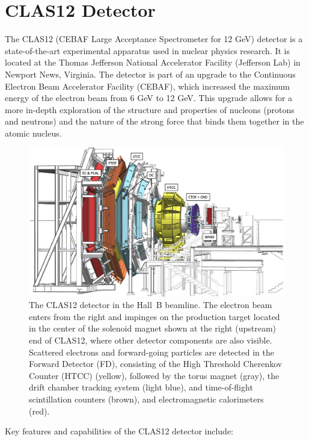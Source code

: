 \documentclass[a4paper,11pt]{article}
\begin{document}
\section{CLAS12 Detector}

The CLAS12 (CEBAF Large Acceptance Spectrometer for 12 GeV) detector is a state-of-the-art experimental apparatus used in nuclear physics research. It is located at the Thomas Jefferson National Accelerator Facility (Jefferson Lab) in Newport News, Virginia. The detector is part of an upgrade to the Continuous Electron Beam Accelerator Facility (CEBAF), which increased the maximum energy of the electron beam from 6 GeV to 12 GeV. This upgrade allows for a more in-depth exploration of the structure and properties of nucleons (protons and neutrons) and the nature of the strong force that binds them together in the atomic nucleus.


\begin{figure}[h!]
\centering
\centerline{\includegraphics[width=0.7\columnwidth]{images/CLAS12-side.png}}
\caption{The CLAS12 detector in the Hall~B beamline. The electron beam enters from the right and impinges on
  the production target located in the center of the solenoid magnet shown at the right (upstream) end of CLAS12,
  where other detector components are also visible. Scattered electrons and forward-going particles are detected
  in the Forward Detector (FD), consisting of the High Threshold Cherenkov Counter (HTCC) (yellow), 
  followed by the torus magnet (gray), the drift chamber tracking system (light blue),
  and time-of-flight scintillation counters (brown), and electromagnetic calorimeters (red). } 
\label{fig:CLAS12}
\end{figure}

Key features and capabilities of the CLAS12 detector include:
\end{document}
